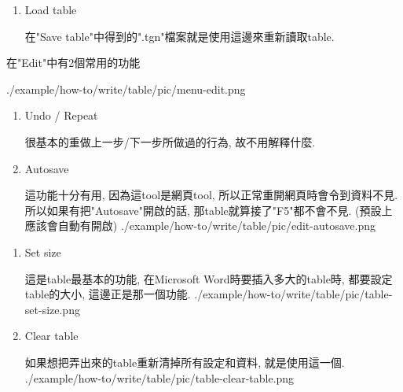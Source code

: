 \begin{enumerate}
{    \InsertFigure
      {./example/how-to/write/table/pic/save-tgn.png}

  } %

  \item
  {
    Load table

    在"Save table"中得到的".tgn"檔案就是使用這邊來重新讀取table.
  } %
  \end{enumerate}

\newpage
{}

  在"Edit"中有2個常用的功能

  \InsertFigure
    {./example/how-to/write/table/pic/menu-edit.png}

  \begin{enumerate}

  \item
  {
    Undo / Repeat

    很基本的重做上一步/下一步所做過的行為, 故不用解釋什麼.
  } %

  \item
  {
    Autosave

    這功能十分有用, 因為這tool是網頁tool, 所以正常重開網頁時會令到資料不見. 所以如果有把"Autosave"開啟的話, 那table就算接了"F5"都不會不見. (預設上應該會自動有開啟)
    \InsertFigure
      {./example/how-to/write/table/pic/edit-autosave.png}
  } %

  \end{enumerate}

\newpage
{}

  \begin{enumerate}

  \item
  {
    Set size

    這是table最基本的功能, 在Microsoft Word時要插入多大的table時, 都要設定table的大小, 這邊正是那一個功能.
    \InsertFigure
      {./example/how-to/write/table/pic/table-set-size.png}
  } %

  \item
  {
    Clear table

    如果想把弄出來的table重新清掉所有設定和資料, 就是使用這一個.
    \InsertFigure
      {./example/how-to/write/table/pic/table-clear-table.png}
  } %

  \end{enumerate}

